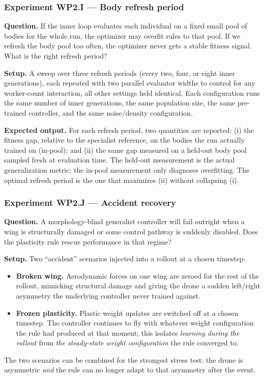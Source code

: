 \documentclass[letterpaper,10pt]{article}
\begin{document}
\subsubsection{Experiment WP2.I --- Body refresh period}
\textbf{Question.} If the inner loop evaluates each individual on a fixed small pool of bodies for the whole run, the optimizer may overfit rules to that pool. If we refresh the body pool too often, the optimizer never gets a stable fitness signal. What is the right refresh period?

\textbf{Setup.} A sweep over three refresh periods (every two, four, or eight inner generations), each repeated with two parallel evaluator widths to control for any worker-count interaction, all other settings held identical. Each configuration runs the same number of inner generations, the same population size, the same pre-trained controller, and the same noise/density configuration.

\textbf{Expected output.} For each refresh period, two quantities are reported: (i) the fitness gap, relative to the specialist reference, on the bodies the run actually trained on (in-pool); and (ii) the same gap measured on a held-out body pool sampled fresh at evaluation time. The held-out measurement is the actual generalization metric; the in-pool measurement only diagnoses overfitting. The optimal refresh period is the one that maximizes (ii) without collapsing (i).

\subsubsection{Experiment WP2.J --- Accident recovery}
\textbf{Question.} A morphology-blind generalist controller will fail outright when a wing is structurally damaged or some control pathway is suddenly disabled. Does the plasticity rule rescue performance in that regime?

\textbf{Setup.} Two ``accident'' scenarios injected into a rollout at a chosen timestep:
\begin{itemize}
    \item \textbf{Broken wing.} Aerodynamic forces on one wing are zeroed for the rest of the rollout, mimicking structural damage and giving the drone a sudden left/right asymmetry the underlying controller never trained against.
    \item \textbf{Frozen plasticity.} Plastic weight updates are switched off at a chosen timestep. The controller continues to fly with whatever weight configuration the rule had produced at that moment; this isolates \emph{learning during the rollout} from \emph{the steady-state weight configuration} the rule converged to.
\end{itemize}
The two scenarios can be combined for the strongest stress test: the drone is asymmetric \emph{and} the rule can no longer adapt to that asymmetry after the event.
\end{document}
